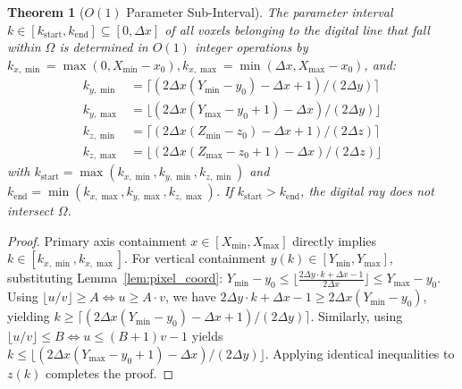 \documentclass[journal=dme,manuscript=article,11pt]{article}
\newtheorem{theorem}{Theorem}
\begin{document}
\begin{theorem}[$O(1)$ Parameter Sub-Interval]
\label{thm:diophantine_bounds}
The parameter interval $k \in [k_{\mathrm{start}}, k_{\mathrm{end}}] \subseteq [0, \Delta x]$ of all voxels belonging to the digital line that fall within $\Omega$ is determined in $O(1)$ integer operations by $k_{x,\min} = \max(0, X_{\min} - x_0), k_{x,\max} = \min(\Delta x, X_{\max} - x_0)$, and:
\begin{align}
    k_{y,\min} &= \lceil (2\Delta x (Y_{\min} - y_0) - \Delta x + 1) / (2\Delta y) \rceil \label{eq:ky_min} \\
    k_{y,\max} &= \lfloor (2\Delta x (Y_{\max} - y_0 + 1) - \Delta x) / (2\Delta y) \rfloor \label{eq:ky_max} \\
    k_{z,\min} &= \lceil (2\Delta x (Z_{\min} - z_0) - \Delta x + 1) / (2\Delta z) \rceil \label{eq:kz_min} \\
    k_{z,\max} &= \lfloor (2\Delta x (Z_{\max} - z_0 + 1) - \Delta x) / (2\Delta z) \rfloor \label{eq:kz_max}
\end{align}
with $k_{\mathrm{start}} = \max(k_{x,\min}, k_{y,\min}, k_{z,\min})$ and $k_{\mathrm{end}} = \min(k_{x,\max}, k_{y,\max}, k_{z,\max})$. If $k_{\mathrm{start}} > k_{\mathrm{end}}$, the digital ray does not intersect $\Omega$.
\end{theorem}

\begin{proof}
Primary axis containment $x \in [X_{\min}, X_{\max}]$ directly implies $k \in [k_{x,\min}, k_{x,\max}]$. For vertical containment $y(k) \in [Y_{\min}, Y_{\max}]$, substituting Lemma~\ref{lem:pixel_coord}: $Y_{\min} - y_0 \le \lfloor \frac{2\Delta y \cdot k + \Delta x - 1}{2\Delta x} \rfloor \le Y_{\max} - y_0$. Using $\lfloor u / v \rfloor \ge A \iff u \ge A \cdot v$, we have $2\Delta y \cdot k + \Delta x - 1 \ge 2\Delta x (Y_{\min} - y_0)$, yielding $k \ge \lceil (2\Delta x (Y_{\min} - y_0) - \Delta x + 1) / (2\Delta y) \rceil$. Similarly, using $\lfloor u / v \rfloor \le B \iff u \le (B + 1) v - 1$ yields $k \le \lfloor (2\Delta x (Y_{\max} - y_0 + 1) - \Delta x) / (2\Delta y) \rfloor$. Applying identical inequalities to $z(k)$ completes the proof.
\end{proof}
\end{document}
